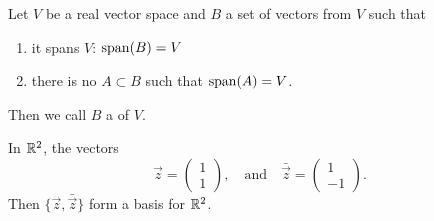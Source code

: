 \begin{definition}
Let $V$ be a real vector space and $B$ a set of vectors from $V$ such
that
\begin{enumerate}
\item it spans $V$: $\operatorname{span}(B)=V$
\item there is no $A\subset B$ such that $\operatorname{span}(A)=V$.
\end{enumerate}
Then we call $B$ a  of $V$.
\end{definition}

\begin{example}
  In $\mathbb{R}^{2}$, the vectors
  \begin{equation}
\vec{z} = \begin{pmatrix}1\\ 1
\end{pmatrix},\quad\mbox{and}\quad\bar{\vec{z}} = \begin{pmatrix}1\\ -1
\end{pmatrix}.
  \end{equation}
  Then $\{\vec{z}, \bar{\vec{z}}\}$ form a basis for $\mathbb{R}^{2}$.
\end{example}
